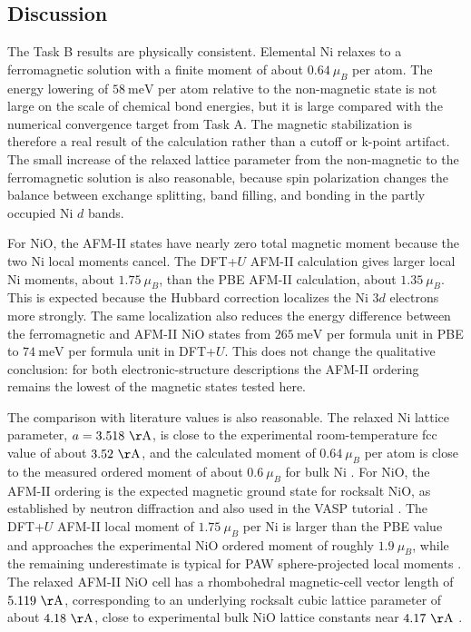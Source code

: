 \subsection{Discussion}

The Task B results are physically consistent.  Elemental Ni relaxes to a
ferromagnetic solution with a finite moment of about \(0.64~\mu_B\) per atom.
The energy lowering of \(58~\mathrm{meV}\) per atom relative to the
non-magnetic state is not large on the scale of chemical bond energies, but it
is large compared with the numerical convergence target from Task A.  The
magnetic stabilization is therefore a real result of the calculation rather
than a cutoff or k-point artifact.  The small increase of the relaxed lattice
parameter from the non-magnetic to the ferromagnetic solution is also
reasonable, because spin polarization changes the balance between exchange
splitting, band filling, and bonding in the partly occupied Ni \(d\) bands.

For NiO, the AFM-II states have nearly zero total magnetic moment because the
two Ni local moments cancel.  The DFT+\(U\) AFM-II calculation gives larger
local Ni moments, about \(1.75~\mu_B\), than the PBE AFM-II calculation,
about \(1.35~\mu_B\).  This is expected because the Hubbard correction
localizes the Ni \(3d\) electrons more strongly.  The same localization also
reduces the energy difference between the ferromagnetic and AFM-II NiO states
from \(265~\mathrm{meV}\) per formula unit in PBE to
\(74~\mathrm{meV}\) per formula unit in DFT+\(U\).  This does not change the
qualitative conclusion: for both electronic-structure descriptions the
AFM-II ordering remains the lowest of the magnetic states tested here.

The comparison with literature values is also reasonable.  The relaxed Ni
lattice parameter, \(a = 3.518~\mathrm{\AA}\), is close to the experimental
room-temperature fcc value of about \(3.52~\mathrm{\AA}\), and the calculated
moment of \(0.64~\mu_B\) per atom is close to the measured ordered moment of
about \(0.6~\mu_B\) for bulk Ni \cite{kittel,crangle-goodman}.  For NiO, the
AFM-II ordering is the expected magnetic ground state for rocksalt NiO, as
established by neutron diffraction and also used in the VASP tutorial
\cite{roth-nio,vasp-nio-magnetism}.  The DFT+\(U\) AFM-II local moment of
\(1.75~\mu_B\) per Ni is larger than the PBE value and approaches the
experimental NiO ordered moment of roughly \(1.9~\mu_B\), while the remaining
underestimate is typical for PAW sphere-projected local moments
\cite{roth-nio,dudarev}.  The relaxed AFM-II NiO cell has a rhombohedral
magnetic-cell vector length of \(5.119~\mathrm{\AA}\), corresponding to an
underlying rocksalt cubic lattice parameter of about \(4.18~\mathrm{\AA}\),
close to experimental bulk NiO lattice constants near \(4.17~\mathrm{\AA}\)
\cite{roth-nio,mp-nio}.

